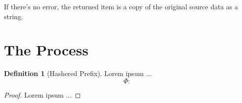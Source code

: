 \documentclass[twoside,twocolumn]{article}
\theoremstyle{definition}
\newtheorem{definition}{Definition}
\theoremstyle{remark}
\begin{document}
If there's no error, the returned item is a copy of the original source data as a string.


\section{The Process}

\begin{definition}[Hashered Prefix]
    \label{hashered}
    Lorem ipsum ... %
    \begin{equation}
        \label{eq:hashered}
        \Phi: %
    \end{equation}

    \begin{proof}
        Lorem ipsum ... %
    \end{proof}
\end{definition}



%
%

\end{document}
